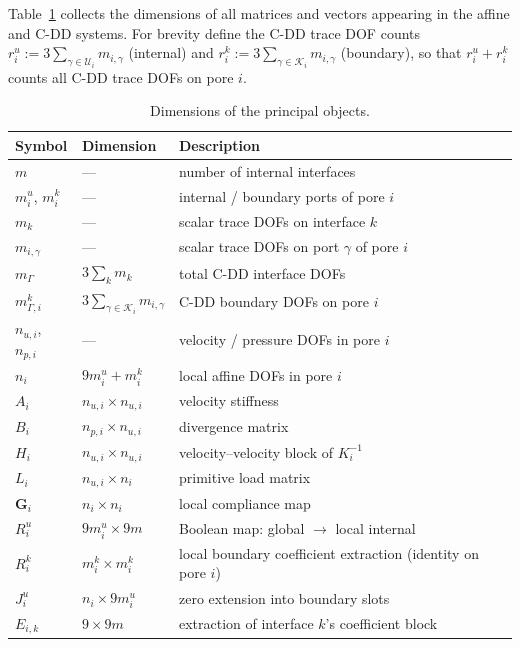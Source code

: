 \documentclass[11pt,a4paper]{article}
\newcommand{\DtN}{\mathbf{G}}
\begin{document}
Table~\ref{tab:dims} collects the dimensions of all matrices and vectors
appearing in the affine and C-DD systems.
For brevity define the C-DD trace DOF counts
$r_i^u := 3\sum_{\gamma\in\mathcal{U}_i} m_{i,\gamma}$
(internal) and
$r_i^k := 3\sum_{\gamma\in\mathcal{K}_i} m_{i,\gamma}$
(boundary), so that $r_i^u + r_i^k$ counts all C-DD trace DOFs on pore $i$.
\begin{table}[htbp]
  \centering
  \caption{Dimensions of the principal objects.}\label{tab:dims}
  \small
  \begin{tabular}{@{}lll@{}}
    \toprule
    Symbol & Dimension & Description \\
    \midrule
    $m$    & ---            & number of internal interfaces \\
    $m_i^u$, $m_i^k$ & --- & internal / boundary ports of pore $i$ \\
    $m_k$  & ---            & scalar trace DOFs on interface $k$ \\
    $m_{i,\gamma}$ & ---    & scalar trace DOFs on port $\gamma$ of pore $i$ \\
    $m_\Gamma$ & $3\sum_k m_k$ & total C-DD interface DOFs \\
    $m_{\Gamma,i}^k$ & $3\sum_{\gamma\in\mathcal{K}_i} m_{i,\gamma}$ & C-DD boundary DOFs on pore $i$ \\
    $n_{u,i}$, $n_{p,i}$ & --- & velocity / pressure DOFs in pore $i$ \\
    $n_i$  & $9m_i^u + m_i^k$ & local affine DOFs in pore $i$ \\
    \midrule
    $A_i$  & $n_{u,i}\times n_{u,i}$ & velocity stiffness \\
    $B_i$  & $n_{p,i}\times n_{u,i}$ & divergence matrix \\
    $H_i$  & $n_{u,i}\times n_{u,i}$ & velocity--velocity block of $K_i^{-1}$ \\
    $L_i$  & $n_{u,i}\times n_i$ & primitive load matrix \\
    $\DtN_i$ & $n_i\times n_i$ & local compliance map \\
    \midrule
    $R_i^u$ & $9m_i^u\times 9m$ & Boolean map: global $\to$ local internal \\
    $R_i^k$ & $m_i^k\times m_i^k$ & local boundary coefficient extraction (identity on pore $i$) \\
    $J_i^u$ & $n_i\times 9m_i^u$ & zero extension into boundary slots \\
    $E_{i,k}$ & $9\times 9m$ & extraction of interface $k$'s coefficient block \\

\end{tabular}
\end{table}
\end{document}
